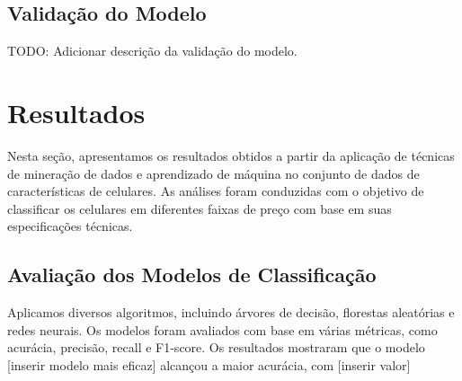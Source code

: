 \documentclass[conference]{IEEEtran}
\begin{document}


\subsection{Validação do Modelo}
TODO: Adicionar descrição da validação do modelo.


\section{Resultados}

Nesta seção, apresentamos os resultados obtidos a partir da aplicação de técnicas de mineração de dados e aprendizado de máquina no conjunto de dados de características de celulares. As análises foram conduzidas com o objetivo de classificar os celulares em diferentes faixas de preço com base em suas especificações técnicas.

\subsection{Avaliação dos Modelos de Classificação}

Aplicamos diversos algoritmos, incluindo árvores de decisão, florestas aleatórias e redes neurais. Os modelos foram avaliados com base em várias métricas, como acurácia, precisão, recall e F1-score. Os resultados mostraram que o modelo [inserir modelo mais eficaz] alcançou a maior acurácia, com [inserir valor]%
\end{document}
